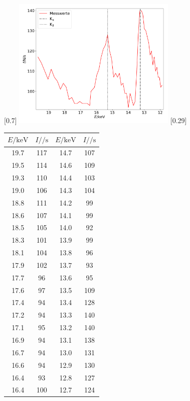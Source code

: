 \begin{figure}[p]
  \centering
  [0.7\textwidth]{
  \includegraphics[width=0.7\textwidth]{wismut.pdf}
  }
  \hfill
  [0.29\textwidth]{
  \begin{tabular}{c c c c}
    \toprule
    $E / \si{\kilo\electronvolt}$ & $I / \si{\per\second}$ & $E / \si{\kilo\electronvolt}$ & $I / \si{\per\second}$ \\
    \midrule
    19.7 & 117 & 14.7 & 107 \\
    19.5 & 114 & 14.6 & 109 \\
    19.3 & 110 & 14.4 & 103 \\
    19.0 & 106 & 14.3 & 104 \\
    18.8 & 111 & 14.2 & 99 \\
    18.6 & 107 & 14.1 & 99 \\
    18.5 & 105 & 14.0 & 92 \\
    18.3 & 101 & 13.9 & 99 \\
    18.1 & 104 & 13.8 & 96 \\
    17.9 & 102 & 13.7 & 93 \\
    17.7 & 96 & 13.6 & 95 \\
    17.6 & 97 & 13.5 & 109 \\
    17.4 & 94 & 13.4 & 128 \\
    17.2 & 94 & 13.3 & 140 \\
    17.1 & 95 & 13.2 & 140 \\
    16.9 & 94 & 13.1 & 138 \\
    16.7 & 94 & 13.0 & 131 \\
    16.6 & 94 & 12.9 & 130 \\
    16.4 & 93 & 12.8 & 127 \\
    16.4 & 100 & 12.7 & 124 \\

\end{tabular}}
\end{figure}
